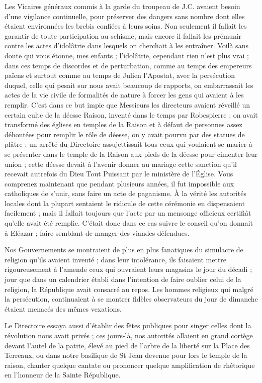 \documentclass[11pt,a4paper]{report}
\begin{document}
Les Vicaires généraux commis à la garde du troupeau de J.C. avaient besoin d'une vigilance continuelle, pour préserver des dangers sans nombre dont elles étaient environnées les brebis confiées à leurs soins. Non seulement il fallait les garantir de toute participation au schisme, mais encore il fallait les prémunir contre les actes d'idolâtrie dans lesquels on cherchait à les entraîner. Voilà sans doute qui vous étonne, mes enfants ; l'idolâtrie, cependant rien n'est plus vrai ; dans ces temps de discordes et de perturbation, comme au temps des empereurs païens et surtout comme au temps de Julien l'Apostat, avec la persécution duquel, celle qui pesait sur nous avait beaucoup de rapports, on embarrassait les actes de la vie civile de formalités de nature à forcer les gens qui avaient à les remplir. C'est dans ce but impie que Messieurs les directeurs avaient réveillé un certain culte de la déesse Raison, inventé dans le temps par Robespierre ; on avait transformé des églises en temples de la Raison et à défaut de personnes assez déhontées pour remplir le rôle de déesse, on y avait pourvu par des statues de plâtre ; un arrêté du Directoire assujettissait tous ceux qui voulaient se marier à se présenter dans le temple de la Raison aux pieds de la déesse pour cimenter leur union ; cette déesse devait à l'avenir donner au mariage cette sanction qu'il recevait autrefois du Dieu Tout Puissant par le ministère de l'Église. Vous comprenez maintenant que pendant plusieurs années, il fut impossible aux catholiques de s'unir, sans faire un acte de paganisme. À la vérité les autorités locales dont la plupart sentaient le ridicule de cette cérémonie en dispensaient facilement ; mais il fallait toujours que l'acte par un mensonge officieux certifiât qu'elle avait été remplie. C'était donc dans ce cas suivre le conseil qu'on donnait à Eléazar ; faire semblant de manger des viandes défendues.

Nos Gouvernements se montraient de plus en plus fanatiques du simulacre de religion qu'ils avaient inventé ; dans leur intolérance, ils faisaient mettre rigoureusement à l'amende ceux qui ouvraient leurs magasins le jour du décadi ; jour que dans un calendrier établi dans l'intention de faire oublier celui de la religion, la République avait consacré au repos. Les hommes religieux qui malgré la persécution, continuaient à se montrer fidèles observateurs du jour de dimanche étaient menacés des mêmes vexations.

Le Directoire essaya aussi d'établir des fêtes publiques pour singer celles dont la révolution nous avait privés ; ces jours-là, nos autorités allaient en grand cortège devant l'autel de la patrie, élevé au pied de l'arbre de la liberté sur la Place des Terreaux, ou dans notre basilique de St Jean devenue pour lors le temple de la raison, chanter quelque cantate ou prononcer quelque amplification de rhétorique en l'honneur de la Sainte République.
\end{document}
